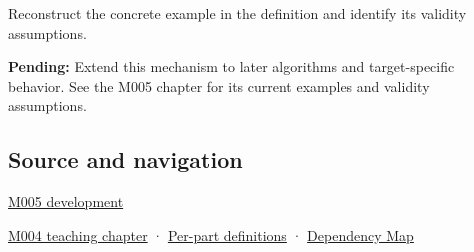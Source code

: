 Reconstruct the concrete example in the definition and identify its validity assumptions.

\textbf{Pending:} Extend this mechanism to later algorithms and target-specific behavior. See the M005 chapter for its current examples and validity assumptions.

\subsection{Source and navigation}\label{appendix-ed8531b46754-source-and-navigation}

\hyperref[01-foundations-i-ch001-when-arithmetic-meets-uncertainty]{M005 development}

\hyperref[01-foundations-i-ch001-a-stretching-ruler-for-real-valued-quantities]{M004 teaching chapter} · \hyperref[appendix-fd090d982a15-m004---parts-61-76]{Per-part definitions} · \hyperref[appendix-4ad47bdd269a]{Dependency Map}
